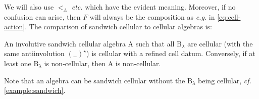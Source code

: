 \documentclass[a4paper,11pt]{amsart}
\newcommand{\eg}{\textsl{e.g.}}
\newcommand{\cf}{\textsl{cf.}}
\newcommand{\etc}{\textsl{etc.}}
\newcommand{\placeholder}{{}_{-}}
\newcommand{\setstuff}[1]{\mathrm{#1}}
\numberwithin{equation}{section}
\let\fullref\autoref
\begin{document}
We will also use $<_{\Lambda}$ {\etc} which have the evident meaning. 
Moreover, if no confusion can arise, then $F$ will always 
be the composition as {\eg} in \eqref{eq:cell-action}.
The comparison of sandwich cellular to cellular algebras is:

\begin{proposition}\label{proposition:cell-compare}
An involutive sandwich cellular algebra $\setstuff{A}$ 
such that all $\setstuff{B}_{\lambda}$ are cellular 
(with the same antiinvolution $(\placeholder)^{\star}$) is cellular 
with a refined cell datum. 
Conversely, if at least one $\setstuff{B}_{\lambda}$ is non-cellular, then 
$\setstuff{A}$ is non-cellular.
\end{proposition}

Note that an algebra can be sandwich cellular without the 
$\setstuff{B}_{\lambda}$ being cellular, {\cf} \fullref{example:sandwich}.
\end{document}
